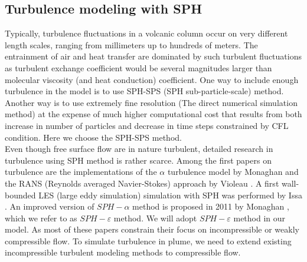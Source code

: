 \documentclass[journal abbreviation, manuscript]{copernicus}
\begin{document}
\subsection{Turbulence modeling with SPH}
Typically, turbulence fluctuations in a volcanic column occur on very different length scales, ranging from millimeters up to hundreds of meters. The entrainment of air and heat transfer are dominated by such turbulent fluctuations as turbulent exchange coefficient would be several magnitudes larger than molecular viscosity (and heat conduction) coefficient. One way to include enough turbulence in the model is to use SPH-SPS (SPH sub-particle-scale) method.
Another way is to use extremely fine resolution (The direct numerical simulation method) at the expense of much higher computational cost that results from both increase in number of particles and decrease in time steps constrained by CFL condition. Here we choose the SPH-SPS method.\\
Even though free surface flow are in nature turbulent, detailed research in turbulence using SPH method is rather scarce. Among the first papers on turbulence are the implementations of the $\alpha$ turbulence model \citep{holm1999fluctuation} by Monaghan \citep{monaghan2002sph} and the RANS (Reynolds averaged Navier-Stokes) approach by Violeau \citep{violeau2007numerical}. A first wall-bounded LES (large eddy simulation) simulation with SPH was performed by Issa \citep{issa2005numerical}. An improved version of $SPH-\alpha$ method is proposed in 2011 by Monaghan \citep{monaghan2011turbulence}, which we refer to as $SPH-\varepsilon$ method. We will adopt $SPH-\varepsilon$ method in our model. As most of these papers constrain their focus on incompressible or weakly compressible flow. To simulate turbulence in plume, we need to extend existing incompressible turbulent modeling methods to compressible flow.\\
\end{document}
